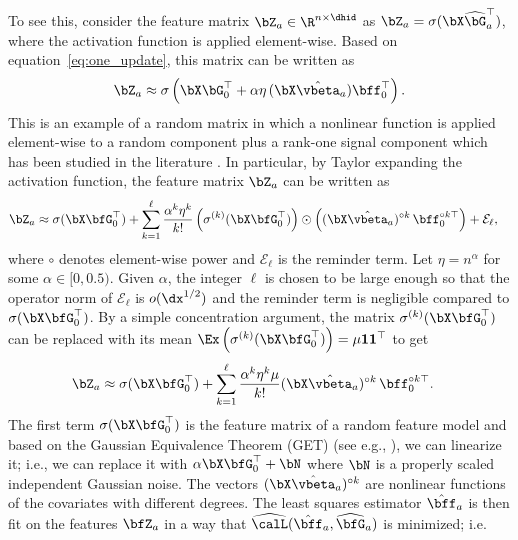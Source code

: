 To see this, consider the feature matrix $\bZ_a \in \R^{n \times \dhid}$ as $\bZ_{a} = \sigma(\bX\widehat\bG_a^\top)$, where the activation function is applied element-wise. Based on equation~\eqref{eq:one_update}, this matrix can be written as
\begin{align*}
    \bZ_{a} \approx \sigma\left(\bX \bG_0^\top + \alpha \eta \, (\bX\hat\vbeta_a) \bff_0^\top\right).
\end{align*}
This is an example of a random matrix in which a nonlinear function is applied element-wise to a random component plus a rank-one signal component which has been studied in the literature \citep{guionnet2023spectral,moniri_atheory2023,moniri2024signal}. In particular, by Taylor expanding the activation function, the feature matrix $\bZ_a$ can be written as
\begin{align*}
    \bZ_{a} &\approx \sigma(\bX\bfG_{0}^\top) +  \sum_{k = 1}^{\ell} \frac{\alpha^k\eta^k}{k!} \left(\sigma^{(k)} (\bX\bfG_{0}^\top)\right) \odot \left((\bX\hat\vbeta_a)^{\circ k}\,\bff_0^{\circ k \top}\right) + \mathcal{E}_\ell,
\end{align*}
where $\circ$ denotes element-wise power and $\mathcal{E}_\ell$ is the reminder term. Let $\eta = n^{\alpha}$ for some $\alpha \in [0, 0.5)$. Given $\alpha$, the integer $\ell$ is chosen to be large enough so that the operator norm of $\mathcal{E}_\ell$ is $o(\dx^{1/2})$ and the reminder term is negligible compared to $\sigma(\bX\bfG_{0}^\top)$. By a simple concentration argument, the matrix $\sigma^{(k)} (\bX\bfG_{0}^\top)$ can be replaced with its mean $\Ex\left(\sigma^{(k)} (\bX\bfG_{0}^\top)\right) = \mu \mathbf{1}\mathbf{1}^\top$ to get
\begin{align*}
    \bZ_{a} &\approx \sigma(\bX\bfG_{0}^\top) +  \sum_{k = 1}^{\ell} \frac{\alpha^k\eta^k \mu}{k!}(\bX\hat\vbeta_a)^{\circ k}\,\bff_0^{\circ k \top}.
\end{align*}
The first term $\sigma(\bX\bfG_{0}^\top)$ is the feature matrix of a random feature model and based on the Gaussian Equivalence Theorem (GET) (see e.g., \citet{goldt2022gaussian,hu2022universality,dandi2023learning,moniri_atheory2023}), we can 
linearize it; i.e., we can replace it with $\alpha \bX\bfG_{0}^\top + \bN$ where $\bN$ is a properly scaled independent Gaussian noise. The vectors $(\bX\hat\vbeta_a)^{\circ k}$ are nonlinear functions of the covariates with different degrees. The least squares estimator $\hat\bff_a$ is then fit on the features $\bfZ_a$ in a way that $\widehat\calL(\hat\bff_a, \widehat\bfG_a)$ is minimized; i.e.
